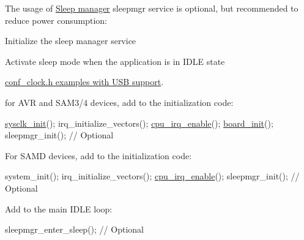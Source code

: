The usage of \hyperlink{group__sleepmgr__group}{Sleep manager} sleepmgr service is optional, but recommended to reduce power consumption\-:
\begin{DoxyItemize}
\item Initialize the sleep manager service
\item Activate sleep mode when the application is in I\-D\-L\-E state
\end{DoxyItemize}

\hyperlink{udc_conf_clock}{conf\-\_\-clock.\-h examples with U\-S\-B support}.

for A\-V\-R and S\-A\-M3/4 devices, add to the initialization code\-: 
\begin{DoxyCode}
        \hyperlink{group__sysclk__group_ga242399e48a97739c88b4d0c00f6101de}{sysclk\_init}();
        irq\_initialize\_vectors();
        \hyperlink{group__interrupt__group_gae4922a4bd8ba4150211fbc7f2302403c}{cpu\_irq\_enable}();
        \hyperlink{group__group__common__boards_ga916f2adc2080b4fe88034086d107a8dc}{board\_init}();
        sleepmgr\_init(); \textcolor{comment}{// Optional}
\end{DoxyCode}


For S\-A\-M\-D devices, add to the initialization code\-: 
\begin{DoxyCode}
        system\_init();
        irq\_initialize\_vectors();
        \hyperlink{group__interrupt__group_gae4922a4bd8ba4150211fbc7f2302403c}{cpu\_irq\_enable}();
        sleepmgr\_init(); \textcolor{comment}{// Optional}
\end{DoxyCode}
 Add to the main I\-D\-L\-E loop\-: 
\begin{DoxyCode}
        sleepmgr\_enter\_sleep(); \textcolor{comment}{// Optional}
\end{DoxyCode}
 